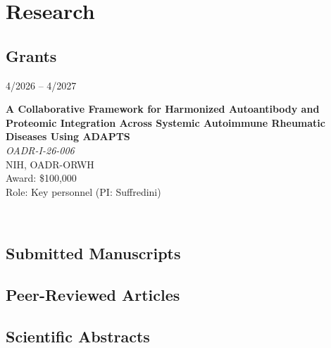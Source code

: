 \documentclass{article}
\newcommand\colleft{.20}
\newcommand\colright{.75}
\newcommand\marce{Marcela Ferrada, MD}
\newcommand{\dini}{Anthony Suffredini, MD}
\newcommand{\julio}{Julio Huapaya, MD, MHS}
\newcommand{\entryfour}[4]
	{
		\begin{minipage}[t]{\colleft\textwidth}
		\hfill \textsc{#1}
		\end{minipage}
		\hfill\vline\hfill
		\begin{minipage}[t]{\colright\textwidth}
		{\bf#2}\\
		\textit{#3}
		\footnotesize{#4}
		\end{minipage}\\
		\entryvspace
	}%
\newcommand{\entryvspace}{\vspace{0.5em}}
\begin{document}
\section*{Research}
	\nocite{*}
	\subsection*{Grants}
		\entryfour{4/2026 -- 4/2027}{A Collaborative Framework for Harmonized Autoantibody and Proteomic Integration Across Systemic Autoimmune Rheumatic Diseases Using ADAPTS}{OADR-I-26-006}{\\NIH, OADR-ORWH\\ Award: \$100,000\\Role: Key personnel (PI: Suffredini)}
	
	\subsection*{Submitted Manuscripts}
		\printbibliography[keyword=submitted, heading=none,resetnumbers]
	\subsection*{Peer-Reviewed Articles}
		\printbibliography[keyword=article, heading=none,resetnumbers]
	\subsection*{Scientific Abstracts}
		\printbibliography[keyword=abstract, heading=none,resetnumbers]	
\end{document}
